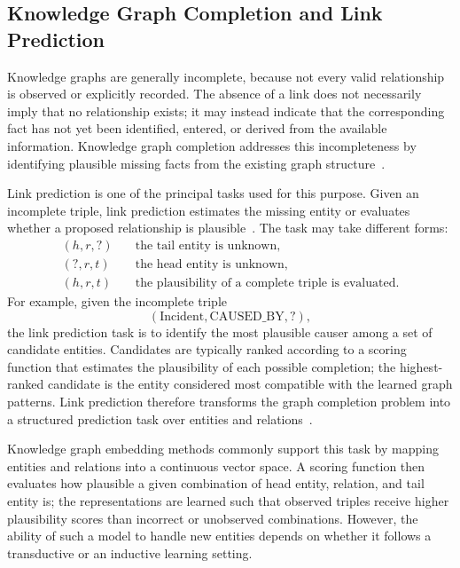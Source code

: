 \subsection{Knowledge Graph Completion and Link Prediction}\label{sec:fund_kg_completion}

Knowledge graphs are generally incomplete, because not every valid
relationship is observed or explicitly recorded. The absence of a link
does not necessarily imply that no relationship exists; it may instead
indicate that the corresponding fact has not yet been identified, entered,
or derived from the available information. Knowledge graph completion
addresses this incompleteness by identifying plausible missing facts from
the existing graph structure~\cite{ji2021survey}.

Link prediction is one of the principal tasks used for this purpose.
Given an incomplete triple, link prediction estimates the missing entity
or evaluates whether a proposed relationship is
plausible~\cite{wang2017kgesurvey, rossi2021comparative}. The task may
take different forms:
\[
\begin{aligned}
  (h, r, ?) &\quad \text{the tail entity is unknown}, \\
  (?, r, t) &\quad \text{the head entity is unknown}, \\
  (h, r, t) &\quad \text{the plausibility of a complete triple is evaluated}.
\end{aligned}
\]
For example, given the incomplete triple
\[
  (\text{Incident}, \text{CAUSED\_BY}, ?),
\]
the link prediction task is to identify the most plausible causer among a
set of candidate entities. Candidates are typically ranked according to a
scoring function that estimates the plausibility of each possible
completion; the highest-ranked candidate is the entity considered most
compatible with the learned graph patterns. Link prediction therefore
transforms the graph completion problem into a structured prediction task
over entities and relations~\cite{rossi2021comparative,
wang2017kgesurvey}.

Knowledge graph embedding methods commonly support this task by mapping
entities and relations into a continuous vector space. A scoring function
then evaluates how plausible a given combination of head entity, relation,
and tail entity is; the representations are learned such that observed
triples receive higher plausibility scores than incorrect or unobserved
combinations. However, the ability of such a model to handle new entities
depends on whether it follows a transductive or an inductive learning
setting.

